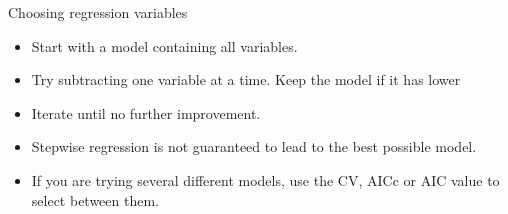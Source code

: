\documentclass[14pt]{beamer}
\makeatletter
\def\biz{\begin{itemize}[<+-| alert@+>]}
\def\eiz{\end{itemize}}
\makeatother
\begin{document}
\begin{frame}[squeeze,shrink=0.99]{Choosing regression variables}

\biz
\item Start with a model containing all variables.

\item Try subtracting one variable at a time. Keep the model if it
has lower 

\item Iterate until no further improvement.
\eiz

\pause%

\structure{\textcolor[rgb]{0.80,0.00,0.00}{Notes:}}
\biz\itemsep=0cm\parskip=0cm
%

\item Stepwise regression is not guaranteed to lead to the best possible
model.

\item If you are trying several different models, use the CV, AICc or AIC %
value to select between them.
\eiz

\end{frame}
\end{document}
